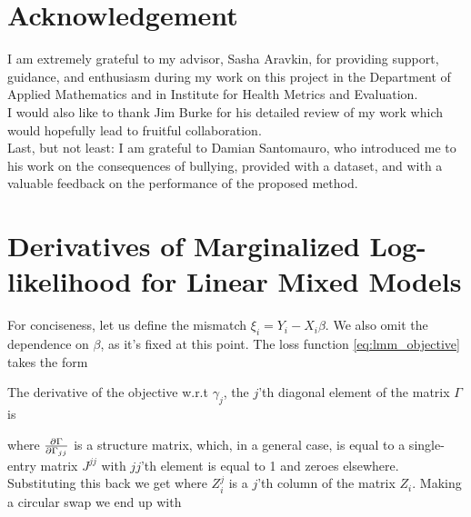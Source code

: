 \documentclass[11pt,letterpaper]{article}
\numberwithin{equation}{section} %
\numberwithin{figure}{section} %
\numberwithin{table}{section} %
\begin{document}
\appendix
\section*{Acknowledgement}
I am extremely grateful to my advisor, Sasha Aravkin, for providing support, guidance, and enthusiasm during my work on this project in the Department of Applied Mathematics and in Institute for Health Metrics and Evaluation.\\
I would also like to thank Jim Burke for his detailed review of my work which would hopefully lead to fruitful collaboration. \\ 
Last, but not least: I am grateful to Damian Santomauro, who introduced me to his work on the consequences of bullying, provided with a dataset, and with a valuable feedback on the performance of the proposed method. \\


\section{Derivatives of Marginalized Log-likelihood for Linear Mixed Models}
\label{appendix:derivatives_of_lmm}
For conciseness, let us define the mismatch $\xi_i = Y_i - X_i\beta$. We also omit the dependence on $\beta$, as it's fixed at this point. The loss function \ref{eq:lmm_objective} takes the form 

The derivative of the objective w.r.t $\gamma_j$, the $j$'th diagonal element of the matrix $\Gamma$ is


where $\frac{\partial \Gamma}{\partial \Gamma_{jj}}$ is a structure matrix, which, in a general case, is equal to a single-entry matrix $J^{jj}$ with $jj$'th element is equal to 1 and zeroes elsewhere. Substituting this back we get
where $Z^j_i$ is a $j$'th column of the matrix $Z_i$. Making a circular swap we end up with

\end{document}
